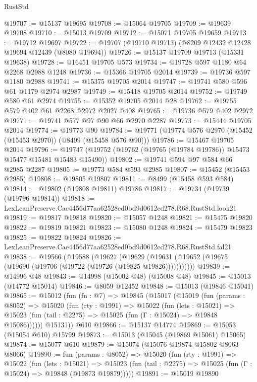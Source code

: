 \begin{lexlean}{RustStd}
\begin{coremodule}
@19707 := @15137 @19695
@19708 := @15064 @19705
@19709 := @19639 @19708
@19710 := @15013 @19709
@19712 := @15071 @19705 @19659
@19713 := @19712 @19697
@19722 := @19707 (@19710 @19713) (@8209 @12432 @12428 @19694 @12439 (@8080 @19694))
@19726 := @15137 @19709 @19713 (@15331 @19638)
@19728 := @16451 @19705 @573
@19734 := @19728 @597 @1180 @64 @2268 @2988 @1248
@19736 := @15366 @19705 @2014
@19739 := @19736 @597 @1180 @2988
@19741 := @15375 @19705 @2014
@19747 := @19741 @580 @596 @61 @1179 @2974 @2987
@19749 := @15418 @19705 @2014
@19752 := @19749 @580 @61 @2974
@19755 := @15352 @19705 @2014 @28
@19762 := @19755 @579 @402 @61 @2268 @2972 @2027 @408
@19765 := @19736 @579 @402 @2972
@19771 := @19741 @577 @97 @90 @66 @2970 @2287
@19773 := @15444 @19705 @2014
@19774 := @19773 @90
@19784 := @19771 (@19774 @576 @2970 (@15452 (@15453 @2970)) (@8499 (@15458 @576 @90)))
@19786 := @15467 @19705 @2014
@19796 := @19747 (@19752 (@19762 (@19765 (@19784 @19786)) @15473 @15477 @15481 @15483 @15490))
@19802 := @19741 @594 @97 @584 @66 @2985 @2287
@19805 := @19773 @584 @593 @2985
@19807 := @15452 (@15453 @2985)
@19808 := @19805 @19807
@19811 := @8499 (@15458 @593 @584)
@19814 := @19802 (@19808 @19811) @19786
@19817 := @19734 (@19739 (@19796 @19814))
@19818 := LexLeanPreserve.Cae4456d77aa62528ed0bd9d0612cd278.R68.RustStd.look21
@19819 := @19817 @19818
@19820 := @15057 @1248
@19821 := @15475 @19820
@19822 := @19819 @19821
@19823 := @15080 @1248
@19824 := @15479 @19823
@19825 := @19822 @19824
@19826 := LexLeanPreserve.Cae4456d77aa62528ed0bd9d0612cd278.R68.RustStd.fal21
@19838 := @19566
    (@19588
      (@19627
        (@19629 (@19631 (@19652 (@19675 (@19690 (@19706 (@19722 (@19726 (@19825 @19826)))))))))))
@19839 := @14996 @48
@19843 := @14998 (@15002 @48) (@15008 @48)
@19845 := @15013 (@14772 @15014)
@19846 := @8059 @12452
@19848 := @15013 (@19846 @15041)
@19865 := @15012
    (fun (fn : @7) =>
    @19845
      (@15017
        (@15019
          (fun (params : @8052) =>
          @15020
            (fun (rty : @1991) =>
            @15022
              (fun (lets : @15021) =>
              @15023 (fun (tail : @2275) => @15025 (fun (Γ : @15024) => @19848 @15086))))))
        @15131))
    @610
@19866 := @15137 @14774
@19869 := @15053 (@15054 @610) @15799
@19873 := @15013 (@15045 (@19869 @15061) @15065)
@19874 := @15077 @610
@19879 := @15074 (@15076 @19874 @15802 @8063 @8066)
@19890 := fun (params : @8052) =>
  @15020
    (fun (rty : @1991) =>
    @15022
      (fun (lets : @15021) =>
      @15023 (fun (tail : @2275) => @15025 (fun (Γ : @15024) => @19848 (@19873 @19879)))))
@19891 := @15019 @19890

\end{coremodule}
\end{lexlean}
